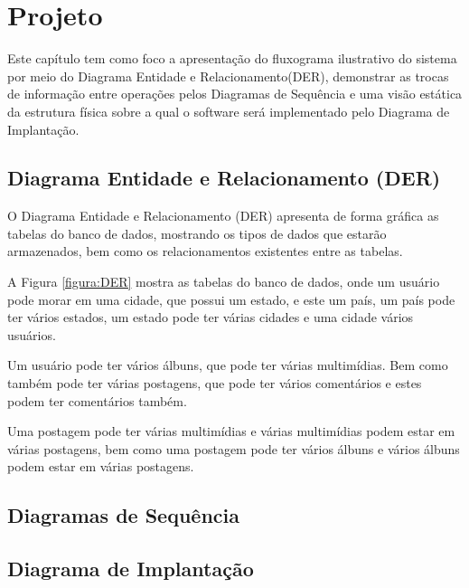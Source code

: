 \chapter{Projeto}

Este capítulo tem como foco a apresentação do fluxograma ilustrativo do sistema por meio do Diagrama Entidade e Relacionamento(DER), demonstrar as trocas de informação entre operações pelos Diagramas de Sequência e uma visão estática da estrutura física sobre a qual o software será implementado pelo Diagrama de Implantação.

\section{Diagrama Entidade e Relacionamento (DER)}

O Diagrama Entidade e Relacionamento (DER) apresenta de forma gráfica as tabelas do banco de dados, mostrando os tipos de dados que estarão armazenados, bem como os relacionamentos existentes entre as tabelas.

A Figura \ref{figura:DER} mostra as tabelas do banco de dados, onde um usuário pode morar em uma cidade, que possui um estado, e este um país, um país pode ter vários estados, um estado pode ter várias cidades e uma cidade vários usuários.

Um usuário pode ter vários álbuns, que pode ter várias multimídias. Bem como também pode ter várias postagens, que pode ter vários comentários e estes podem ter comentários também.

Uma postagem pode ter várias multimídias e várias multimídias podem estar em várias postagens, bem como uma postagem pode ter vários álbuns e vários álbuns podem estar em várias postagens.


\newpage

\section{Diagramas de Sequência}

\section{Diagrama de Implantação}
